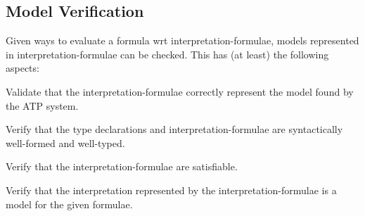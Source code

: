 \documentclass{easychair}
\newenvironment{packed_enumerate}{
\vspace*{-0.3em}
\begin{enumerate}
\setlength{\partopsep}{0pt}
\setlength{\itemsep}{1pt}
\setlength{\parskip}{0pt}
\setlength{\parsep}{0pt}
}{\end{enumerate}}
\begin{document}
\subsection{Model Verification}
\label{Verification}

Given ways to evaluate a formula wrt interpretation-formulae, models represented in
interpretation-formulae can be checked.
This has (at least) the following aspects: 
\begin{packed_enumerate}
\item Validate that the interpretation-formulae correctly represent the model found 
      by the ATP system.
\item Verify that the type declarations and interpretation-formulae are syntactically well-formed 
      and well-typed. 
\item Verify that the interpretation-formulae are satisfiable.
\item Verify that the interpretation represented by the interpretation-formulae is a model for 
      the given formulae.
\end{packed_enumerate}
\end{document}
